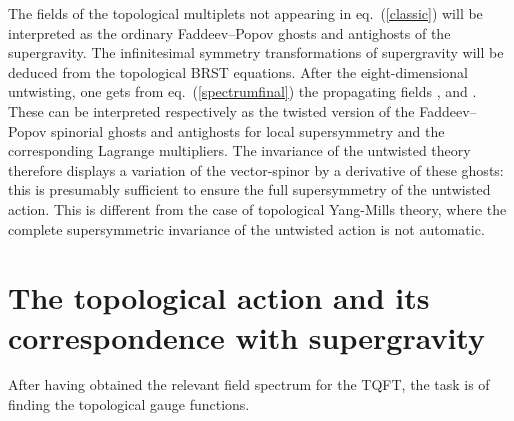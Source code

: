 \documentclass[a4paper,12pt]{article}
\begin{document}
The fields of the topological multiplets not appearing in
eq.~(\ref{classic}) will be interpreted as the ordinary 
Faddeev--Popov ghosts and antighosts of the supergravity. 
The infinitesimal symmetry transformations of supergravity
will be deduced from the topological BRST equations.
After the eight-dimensional
untwisting, one gets from 
eq.~(\ref{spectrumfinal}) the propagating fields 
\coordHE{}, 
\coordHE{}
and \coordHE{}.
These can be interpreted respectively as 
the twisted version of the Faddeev--Popov spinorial 
ghosts and antighosts for local supersymmetry and the
corresponding Lagrange multipliers. 
The invariance of the untwisted theory therefore displays a
variation of the vector-spinor by a derivative of these ghosts:
this is presumably sufficient to ensure the full supersymmetry
of the untwisted action.
This is different from the case of topological Yang-Mills theory, where
the complete supersymmetric invariance of the untwisted action is not
automatic.


\section{The topological action and its correspondence with supergravity}

After having obtained the relevant field spectrum for the TQFT, the task
is of finding the topological gauge functions. 
\end{document}
